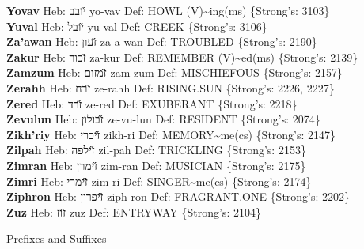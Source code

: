 {\textbf{Yovav} Heb: {\large\H יובב} yo-vav Def: HOWL (V)\textasciitilde{}ing(ms) \{Strong's: 3103\}\hfill{}\\

\textbf{Yuval} Heb: {\large\H יובל} yu-val Def: CREEK \{Strong's: 3106\}\hfill{}\\

\textbf{Za'awan} Heb: {\large\H זעון} za-a-wan Def: TROUBLED \{Strong's: 2190\}\hfill{}\\

\textbf{Zakur} Heb: {\large\H זכור} za-kur Def: REMEMBER (V)\textasciitilde{}ed(ms) \{Strong's: 2139\}\hfill{}\\

\textbf{Zamzum} Heb: {\large\H זמזום} zam-zum Def: MISCHIEFOUS \{Strong's: 2157\}\hfill{}\\

\textbf{Zerahh} Heb: {\large\H זרח} ze-rahh Def: RISING.SUN \{Strong's: 2226, 2227\}\hfill{}\\

\textbf{Zered} Heb: {\large\H זרד} ze-red Def: EXUBERANT \{Strong's: 2218\}\hfill{}\\

\textbf{Zevulun} Heb: {\large\H זבולון} ze-vu-lun Def: RESIDENT \{Strong's: 2074\}\hfill{}\\

\textbf{Zikh'riy} Heb: {\large\H זיכרי} zikh-ri Def: MEMORY\textasciitilde{}me(cs) \{Strong's: 2147\}\hfill{}\\

\textbf{Zilpah} Heb: {\large\H זילפה} zil-pah Def: TRICKLING \{Strong's: 2153\}\hfill{}\\

\textbf{Zimran} Heb: {\large\H זימרן} zim-ran Def: MUSICIAN \{Strong's: 2175\}\hfill{}\\

\textbf{Zimri} Heb: {\large\H זימרי} zim-ri Def: SINGER\textasciitilde{}me(cs) \{Strong's: 2174\}\hfill{}\\

\textbf{Ziphron} Heb: {\large\H זיפרון} ziph-ron Def: FRAGRANT.ONE \{Strong's: 2202\}\hfill{}\\

\textbf{Zuz} Heb: {\large\H זוז} zuz Def: ENTRYWAY \{Strong's: 2104\}\hfill{}\\

\newpage
\begin{center}
{\Large{}Prefixes and Suffixes}\label{page:dictionary:pre-n-suf}
\end{center}

}

